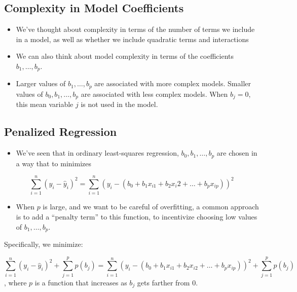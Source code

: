 \documentclass[]{book}
\providecommand{\tightlist}{%
  \setlength{\itemsep}{0pt}\setlength{\parskip}{0pt}}
\begin{document}
\subsection{Complexity in Model
Coefficients}\label{complexity-in-model-coefficients}

\begin{itemize}
\item
  We've thought about complexity in terms of the number of terms we
  include in a model, as well as whether we include quadratic terms and
  interactions
\item
  We can also think about model complexity in terms of the coefficients
  \(b_1, \ldots, b_p\).
\item
  Larger values of \(b_1, \ldots, b_p\) are associated with more complex
  models. Smaller values of \(b_0, b_1, \ldots, b_p\) are associated
  with less complex models. When \(b_j=0\), this mean variable \(j\) is
  not used in the model.
\end{itemize}

\subsection{Penalized Regression}\label{penalized-regression}

\begin{itemize}
\tightlist
\item
  We've seen that in ordinary least-squares regression,
  \(b_0, b_1, \ldots, b_p\) are chosen in a way that to minimizes
\end{itemize}

\[ \displaystyle\sum_{i=1}^n (y_i -\hat{y}_i)^2  = \displaystyle\sum_{i=1}^n (y_i -(b_0 + b_1x_{i1} + b_2{x_i2} + \ldots +b_px_{ip}))^2 \]

\begin{itemize}
\tightlist
\item
  When \(p\) is large, and we want to be careful of overfitting, a
  common approach is to add a ``penalty term'' to this function, to
  incentivize choosing low values of \(b_1, \ldots, b_p\).
\end{itemize}

Specifically, we minimize:

\[ \displaystyle\sum_{i=1}^n (y_i -\hat{y}_i)^2 + \displaystyle\sum_{j=1}^pp(b_j) = \displaystyle\sum_{i=1}^n (y_i -(b_0 + b_1x_{i1} + b_2x_{i2} + \ldots + b_px_{ip}))^2 + \displaystyle\sum_{j=1}^pp(b_j)\],
where \(p\) is a function that increases as \(b_j\) gets farther from 0.
\end{document}

